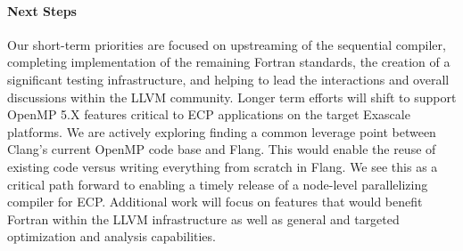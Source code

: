 \paragraph{Next Steps}
Our short-term priorities are focused on upstreaming of the
sequential compiler, completing implementation of the remaining Fortran standards,
the creation of a significant testing infrastructure, and helping to lead the
interactions and overall discussions within the LLVM community.  Longer term efforts
will shift to support OpenMP 5.X features critical to ECP applications
on the target Exascale platforms.  We are actively exploring finding a
common leverage point between Clang's current OpenMP code base and
Flang.  This would enable the reuse of existing code versus writing
everything from scratch in Flang.  We see this as a critical path
forward to enabling a timely release of a node-level parallelizing
compiler for ECP.  Additional work will focus on features that would
benefit Fortran within the LLVM infrastructure as well as general and
targeted optimization and analysis capabilities.

